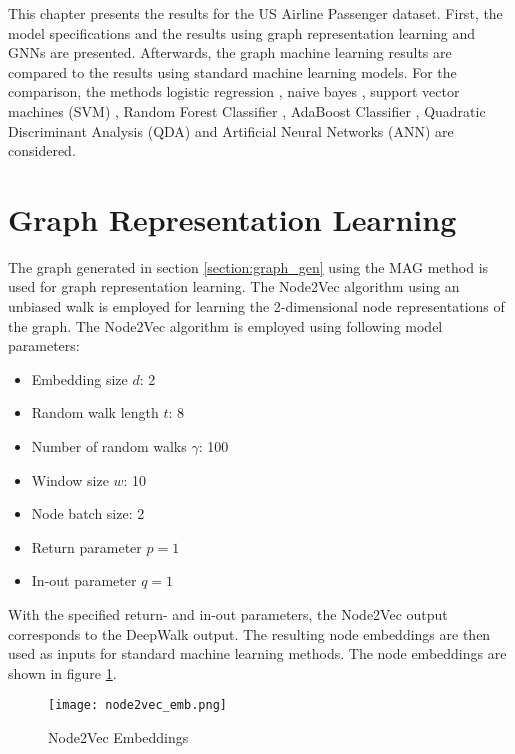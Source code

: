   
  This chapter presents the results for the US Airline Passenger dataset. First, 
  the model specifications and the results using graph representation learning 
  and GNNs are presented. Afterwards, the graph machine learning results are 
  compared to the results using standard machine learning models. For the 
  comparison, the methods logistic regression \citep{cramer2002origins}, naive 
  bayes \citep{zhang2004bayes}, support vector machines (SVM) 
  \citep{platt1999probabilistic,chang2011libsvm}, Random Forest Classifier 
  \citep{breiman2001random}, AdaBoost Classifier 
  \citep{freund1997decision,hastie2009multi}, Quadratic Discriminant Analysis
  (QDA) \citep{tharwat2016linear} and Artificial Neural Networks (ANN)
  \citep{mcculloch1943logical} are considered.

  \section{Graph Representation Learning}
  \label{section:result_n2v}

  The graph generated in section \ref{section:graph_gen} using the MAG method
  is used for graph representation learning. The Node2Vec algorithm using an
  unbiased walk is employed for learning the 2-dimensional node representations 
  of the graph. The Node2Vec algorithm is employed using following model 
  parameters:

  \begin{itemize}
    \setlength\itemsep{0.1em}
    \item Embedding size $d$: 2
    \item Random walk length $t$: 8
    \item Number of random walks $\gamma$: 100
    \item Window size $w$: 10
    \item Node batch size: 2
    \item Return parameter $p=1$
    \item In-out parameter $q=1$
  \end{itemize}

  \noindent With the specified return- and in-out parameters, the Node2Vec
  output corresponds to the DeepWalk output. The resulting node embeddings are
  then used as inputs for standard machine learning methods. The node embeddings 
  are shown in figure \ref{fig:node2vec}. 

  \begin{figure}[h]
		\centering
		\texttt{[image: node2vec\_emb.png]}
		\caption{Node2Vec Embeddings}
        \label{fig:node2vec}
  \end{figure}

